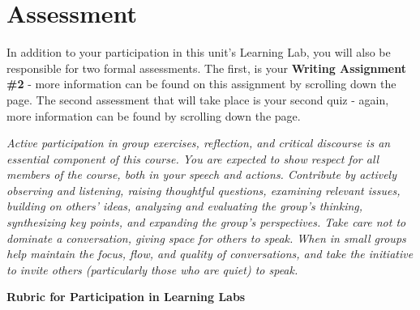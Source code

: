\documentclass[
]{book}
\begin{document}
\hypertarget{assessment-8}{%
\section*{Assessment}\label{assessment-8}}

\begin{assessment}
In addition to your participation in this unit's Learning Lab, you will also be responsible for two formal assessments. The first, is your \textbf{Writing Assignment \#2} - more information can be found on this assignment by scrolling down the page. The second assessment that will take place is your second quiz - again, more information can be found by scrolling down the page.

\emph{Active participation in group exercises, reflection, and critical discourse is an essential component of this course. You are expected to show respect for all members of the course, both in your speech and actions. Contribute by actively observing and listening, raising thoughtful questions, examining relevant issues, building on others' ideas, analyzing and evaluating the group's thinking, synthesizing key points, and expanding the group's perspectives. Take care not to dominate a conversation, giving space for others to speak. When in small groups help maintain the focus, flow, and quality of conversations, and take the initiative to invite others (particularly those who are quiet) to speak.}

\textbf{Rubric for Participation in Learning Labs}


\end{assessment}
\end{document}
